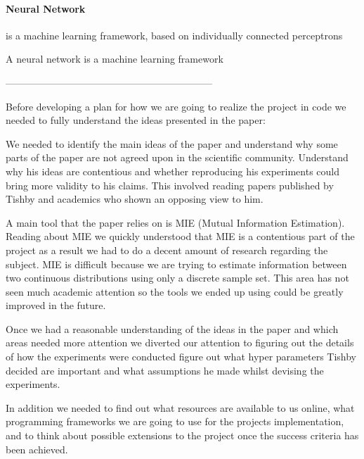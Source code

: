 \paragraph{Neural Network} is a machine learning framework, based on
individually connected perceptrons

A neural network is a machine learning framework

---------------------------------------------------------------


Before developing a plan for how we are going to realize the project in code we
needed to fully understand the ideas presented in the paper:
\begin{itemize}
    \begin{item}
      We needed to identify the main ideas of the paper and understand why some
      parts of the paper are not agreed upon in the scientific community.
      Understand why his ideas are contentious and whether reproducing his
      experiments could bring more validity to his claims. This involved reading
      papers published by Tishby and academics who shown an opposing view to
      him.
    \end{item}
    \begin{item}
      A main tool that the paper relies on is MIE (Mutual Information
      Estimation). Reading about MIE we quickly understood that MIE is a
      contentious part of the project as a result we had to do a decent amount
      of research regarding the subject. MIE is difficult because we are trying
      to estimate information between two continuous distributions using only a
      discrete sample set. This area has not seen much academic attention so the
      tools we ended up using could be greatly improved in the future.
    \end{item}
\end{itemize}

Once we had a reasonable understanding of the ideas in the paper and which areas
needed more attention we diverted our attention to figuring out the details of
how the experiments were conducted figure out what hyper parameters Tishby
decided are important and what assumptions he made whilst devising the
experiments. 

In addition we needed to find out what resources are available to us online,
what programming frameworks we are going to use for the projects implementation,
and to think about possible extensions to the project once the success criteria
has been achieved.

